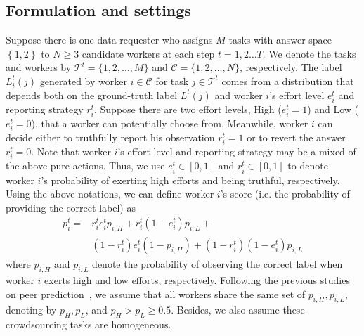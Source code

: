 \documentclass{article}
\begin{document}
\subsection{Formulation and settings}
Suppose there is one data requester who assigns $M$ tasks with answer space $\left\{1,2\right\}$ to $N \geq 3$ candidate workers at each step $t=1,2\ldots T$.
We denote the tasks and workers by $\mathcal{T}^{t}=\{1,2,\ldots,M\}$ and $\mathcal{C}=\{1,2,\ldots,N\}$, respectively.
The label $L^{t}_{i}(j)$ generated by worker $i\in \mathcal{C}$ for task $j\in\mathcal{T}^{t}$ comes from a distribution that depends both on the ground-truth label $L^{t}(j)$ and worker $i$'s effort level $e^{t}_i$ and reporting strategy $r^{t}_i$.
Suppose there are two effort levels, High ($e^{t}_i=1$) and Low ($e^{t}_i=0$), that a worker can potentially choose from.
Meanwhile, worker $i$ can decide either to truthfully report his observation $r^{t}_i = 1$ or to revert the answer $r^{t}_i = 0$.
Note that worker $i$'s effort level and reporting strategy may be a mixed of the above pure actions.
Thus, we use $e^{t}_i\in[0,1]$ and $r^{t}_i\in[0,1]$ to denote worker $i$'s probability of exerting high efforts and being truthful, respectively.
Using the above notations, we can define worker $i$'s score (i.e. the probability of providing the correct label)  as
\begin{equation}
\begin{split}
p^{t}_i=&r^{t}_i e^{t}_i p_{i, H}+r^{t}_i (1-e^{t}_i) p_{i, L}+\\
&(1-r^{t}_i) e^{t}_i (1-p_{i, H})+(1-r^{t}_i) (1-e^{t}_i) p_{i, L}
\end{split}
\end{equation}
where $p_{i, H}$ and $p_{i, L}$ denote the probability of observing the correct label when worker $i$ exerts high and low efforts, respectively.
Following the previous studies on peer prediction~\cite{dasgupta2013crowdsourced,liu2017sequential}, we assume that all workers share the same set of $p_{i, H}, p_{i, L}$, denoting by $p_H, p_L$, and $p_{H}>p_{L}\geq 0.5$.
Besides, we also assume these crowdsourcing tasks are homogeneous.
\end{document}
